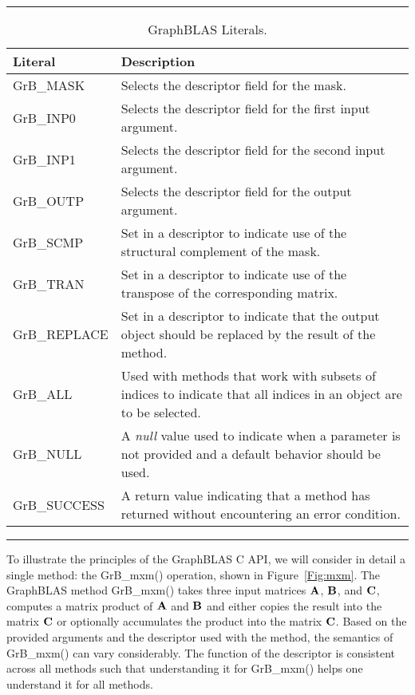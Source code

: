 \begin{table}[h]
\hrule
\begin{center}
\caption{GraphBLAS Literals.}
\label{Tab:GrBliterals}
\begin{tabular}{lp{5.25cm}}
Literal                 & Description  \\
\hline
	{\sf GrB\_MASK}      & Selects the descriptor field for the mask. \\
	{\sf GrB\_INP0}      & Selects the descriptor field for the first input argument. \\
	{\sf GrB\_INP1}      & Selects the descriptor field for the second input argument. \\
	{\sf GrB\_OUTP}      & Selects the descriptor field for the output argument. \\
	{\sf GrB\_SCMP}      & Set in a descriptor to indicate use of the structural complement of the mask. \\
	{\sf GrB\_TRAN}      & Set in a descriptor to indicate use of the transpose of the corresponding matrix. \\
	{\sf GrB\_REPLACE}   & Set in a descriptor to indicate that the output object should be replaced by the result of the method. \\
	{\sf GrB\_ALL}       & Used with methods that work with subsets of indices to indicate that all indices in an object are to be selected. \\
	{\sf GrB\_NULL}      & A \emph{null} value used to indicate when a parameter is not provided and a default behavior should be used. \\
	{\sf GrB\_SUCCESS}   & A return value indicating that a method has returned without encountering an error condition. \\
\end{tabular}
\end{center}
\hrule
\end{table}

To illustrate the principles of the GraphBLAS C API, we
will consider in detail a single method: the {\sf GrB\_mxm()} operation, shown in Figure~\ref{Fig:mxm}.
The GraphBLAS method {\sf GrB\_mxm()} takes three input matrices ${\bf A}$, ${\bf B}$, and ${\bf C}$, 
computes a matrix product of ${\bf A}$ and ${\bf B}$ and either copies the result into the matrix ${\bf C}$
or optionally accumulates the product into the matrix ${\bf C}$.  Based on the provided arguments 
and the descriptor used with the method, the semantics of {\sf GrB\_mxm()} can vary considerably.
The function of the descriptor is consistent across all methods such that understanding it for
{\sf GrB\_mxm()} helps one understand it for all methods.

